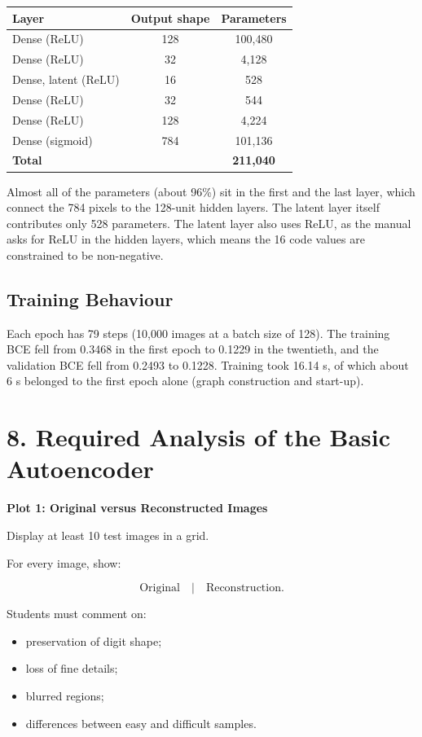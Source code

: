 \documentclass[10pt]{article}
\begin{document}
\begin{center}
\begin{tabular}{|l|c|c|}
\hline
Layer & Output shape & Parameters\\
\hline
Dense (ReLU) & 128 & 100,480\\
Dense (ReLU) & 32 & 4,128\\
Dense, latent (ReLU) & 16 & 528\\
Dense (ReLU) & 32 & 544\\
Dense (ReLU) & 128 & 4,224\\
Dense (sigmoid) & 784 & 101,136\\
\hline
\textbf{Total} & & \textbf{211,040}\\
\hline
\end{tabular}
\end{center}

Almost all of the parameters (about 96\%) sit in the first and the last layer,
which connect the 784 pixels to the 128-unit hidden layers. The latent layer
itself contributes only 528 parameters. The latent layer also uses ReLU, as
the manual asks for ReLU in the hidden layers, which means the 16 code values
are constrained to be non-negative.

\subsection*{Training Behaviour}

Each epoch has 79 steps (10,000 images at a batch size of 128). The training
BCE fell from 0.3468 in the first epoch to 0.1229 in the twentieth, and the
validation BCE fell from 0.2493 to 0.1228. Training took 16.14 s, of which
about 6 s belonged to the first epoch alone (graph construction and start-up).

\section*{8. Required Analysis of the Basic Autoencoder}

\textbf{Plot 1: Original versus Reconstructed Images}

Display at least 10 test images in a grid.

For every image, show:

\[
\text{Original}\quad|\quad\text{Reconstruction}.
\]

Students must comment on:

\begin{itemize}
\item preservation of digit shape;
\item loss of fine details;
\item blurred regions;
\item differences between easy and difficult samples.
\end{itemize}
\end{document}

